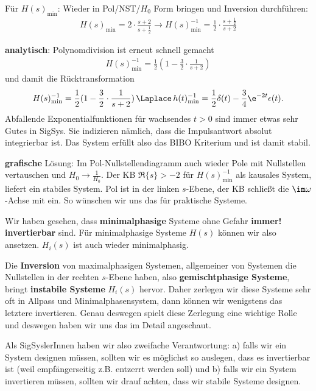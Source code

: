 \begin{Ansatz}
Für $H(s)_\mathrm{min}$:
Wieder in Pol/NST/$H_0$ Form bringen und Inversion durchführen:
\begin{align}
\label{eq:4926427BA9_Hsmininv_series}
H(s)_\mathrm{min} = 2\cdot\frac{s+2}{s+\frac{1}{2}}\rightarrow
H(s)_\mathrm{min}^{-1} = \frac{1}{2}\cdot\frac{s+\frac{1}{2}}{s+2}
\end{align}
\end{Ansatz}

\begin{ExCalc}
\textbf{analytisch}: Polynomdivision ist erneut schnell gemacht
\begin{align}
\label{eq:4926427BA9_Hsmininv_parallel}
H(s)_\mathrm{min}^{-1} = \frac{1}{2} (1-\frac{3}{2}\cdot\frac{1}{s+2})
\end{align}
und damit die Rücktransformation
\begin{align}
H(s)_\mathrm{min}^{-1} = \frac{1}{2} (1-\frac{3}{2}\cdot\frac{1}{s+2})
\,\Laplace\,
h(t)_\mathrm{min}^{-1} = \frac{1}{2}\delta(t) - \frac{3}{4}\e^{-2 t}\epsilon(t).
\end{align}
Abfallende Exponentialfunktionen für wachsendes $t>0$ sind immer etwas sehr
Gutes in SigSys. Sie indizieren nämlich, dass die Impulsantwort absolut
integrierbar ist. Das System erfüllt also das BIBO Kriterium und ist damit stabil.

\noindent\textbf{grafische} Lösung:
Im Pol-Nullstellendiagramm auch wieder Pole mit Nullstellen vertauschen
und $H_0\to\frac{1}{H_0}$. Der KB $\Re\{s\}>-2$ für $H(s)_\mathrm{min}^{-1}$
als kausales System, liefert ein stabiles System. Pol ist in der linken $s$-Ebene,
der KB schließt die $\im\omega$-Achse mit ein. So wünschen wir uns das für
praktische Systeme.
\end{ExCalc}


\begin{Loesung}
Wir haben gesehen, dass \textbf{minimalphasige} Systeme ohne Gefahr \textbf{immer! invertierbar}
sind. Für minimalphasige Systeme $H(s)$
können wir also  ansetzen.
$H_i(s)$ ist auch wieder minimalphasig.

Die \textbf{Inversion} von maximalphasigen Systemen, allgemeiner von Systemen
die Nullstellen in der rechten $s$-Ebene haben, also \textbf{gemischtphasige Systeme},
bringt \textbf{instabile Systeme} $H_i(s)$ hervor.
Daher zerlegen wir diese Systeme sehr oft in Allpass und Minimalphasensystem,
dann können wir wenigstens das letztere invertieren. Genau deswegen spielt
diese Zerlegung eine wichtige Rolle und deswegen haben wir uns das im Detail
angeschaut.

Als SigSyslerInnen haben wir also zweifache Verantwortung: a) falls wir
ein System designen müssen, sollten wir es möglichst so auslegen, dass es
invertierbar ist (weil empfängerseitig z.B. entzerrt werden soll)
und b) falls wir ein System invertieren müssen, sollten wir
drauf achten, dass wir stabile Systeme designen.

\end{Loesung}

